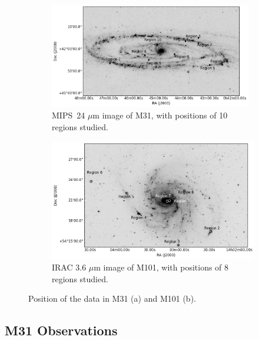     \begin{figure}
    \begin{subfigure}[b]{0.5\textwidth}
        \includegraphics[width=0.97\textwidth]{../images0.01/M31/M31.png}
        \caption{MIPS~24 $\mu$m image of M31, with positions of 10 regions studied.}
        \label{fig: regions in m31}
    \end{subfigure}
    \hfill
        \begin{subfigure}[b]{0.5\textwidth}
         \includegraphics[width=\textwidth]{../images0.01/M101/M101.png}
        \caption{IRAC 3.6 $\mu$m image of M101, with positions of 8 regions studied.}
    \label{fig: regions in m101}
    \end{subfigure}
    \caption[Position of the data in M31 and M101]{Position of the data in M31 (a) and M101 (b).}
\end{figure}

    \subsection{M31 Observations}
     \label{Sec: data_M31_SOMN} 
     
